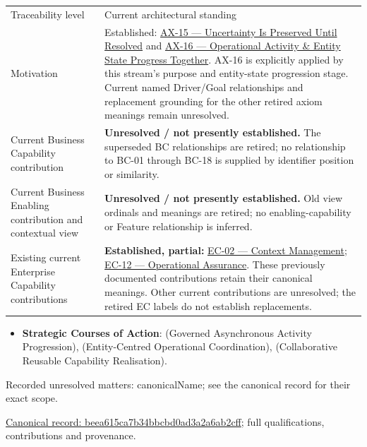 \begin{longtable}{>{\raggedright\arraybackslash}p{}>{\raggedright\arraybackslash}p{}}
Traceability level & Current architectural standing \\
Motivation & Established: \hyperref[element:ef8abbaec37e4890ad78b9f263e67906]{AX-15 — Uncertainty Is Preserved Until Resolved} and \hyperref[element:de7e90f46127455a9ec9ad3b9b48ba54]{AX-16 — Operational Activity \& Entity State Progress Together}. AX-16 is explicitly applied by this stream’s purpose and entity-state progression stage. Current named Driver/Goal relationships and replacement grounding for the other retired axiom meanings remain unresolved. \\
Current Business Capability contribution & \textbf{Unresolved / not presently established.} The superseded BC relationships are retired; no relationship to BC-01 through BC-18 is supplied by identifier position or similarity. \\
Current Business Enabling contribution and contextual view & \textbf{Unresolved / not presently established.} Old view ordinals and meanings are retired; no enabling-capability or Feature relationship is inferred. \\
Existing current Enterprise Capability contributions & \textbf{Established, partial:} \href{\detokenize{../../../../../docs/markdown/02-strategy/capabilities/enterprise-capabilities.md#ec-02-context-management}}{EC-02 — Context Management}; \href{\detokenize{../../../../../docs/markdown/02-strategy/capabilities/enterprise-capabilities.md#ec-12-operational-assurance}}{EC-12 — Operational Assurance}. These previously documented contributions retain their canonical meanings. Other current contributions are unresolved; the retired EC labels do not establish replacements. \\
\end{longtable}


\begin{itemize}


\item \textbf{Strategic Courses of Action}: \texttt{} (Governed Asynchronous Activity Progression), \texttt{} (Entity-Centred Operational Coordination), \texttt{} (Collaborative Reusable Capability Realisation).

\end{itemize}

{\small Recorded unresolved matters: canonicalName; see the canonical record for their exact scope.}\par
{\footnotesize \href{../../../../continuum/strategy/value-stream/beea615ca7b34bbcbd0ad3a2a6ab2cff.md}{Canonical record: beea615ca7b34bbcbd0ad3a2a6ab2cff}; full qualifications, contributions and provenance.}\par
